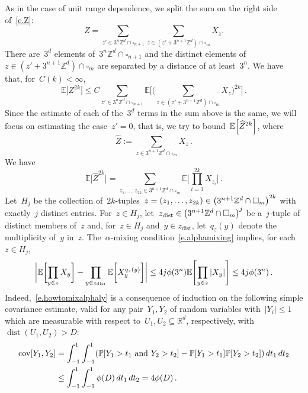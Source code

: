 \documentclass[11pt,twoside]{article} %
\let\oldsquare\square %
\renewcommand{\square}{\oldsquare}
\numberwithin{equation}{section}
\theoremstyle{definition}
\let\originalleft\left
\let\originalright\right
\renewcommand{\left}{\mathopen{}\mathclose\bgroup\originalleft}
\renewcommand{\right}{\aftergroup\egroup\originalright}
\newcommand*{\Zd}{\ensuremath{\mathbb{Z}^d}}
\newcommand*{\Rd}{\ensuremath{\mathbb{R}^d}}
\renewcommand*{\hat}{\widehat}
\newcommand{\cu}{\square}
\renewcommand{\P}{\mathbb{P}}
\newcommand{\E}{\mathbb{E}}
\DeclareMathOperator{\dist}{dist}
\DeclareMathOperator{\cov}{cov}
\begin{document}
As in the case of unit range dependence, we split the sum on the right side of~\eqref{e.Z}:
\begin{equation}
Z = \sum_{z'\in 3^n\Zd \cap \cu_{n+1}} \sum_{z\in (z'+3^{n+1}\Zd)\cap \cu_m} X_z.
\end{equation}
There are~$3^d$ elements of~$3^n\Zd \cap \cu_{n+1}$ and the distinct elements of~$z\in (z'+3^{n+1}\Zd)\cap \cu_m$ are separated by a distance of at least~$3^n$. We have that, for~$C(k)<\infty$, 
\begin{equation}
\E\bigl[ Z^{2k} \bigr] 
\leq 
C\sum_{z'\in 3^n\Zd \cap \cu_{n+1}}
\E \biggl[ 
\biggl( \sum_{z\in (z'+3^{n+1}\Zd)\cap \cu_m} X_z \biggr)^{\!\! 2k} 
\biggr]
\,.
\end{equation}
Since the estimate of each of the~$3^d$ terms in the sum above is the same, we will focus on estimating the case~$z'=0$, that is, we try to bound~$\E \left[ \hat{Z}^{2k} \right]$, where 
\begin{equation}
\hat{Z}:= \sum_{z\in  3^{n+1}\Zd \cap \cu_m} X_z
\,.  
\end{equation}
We have 
\begin{equation*} \label{}
\E \bigl[ \hat{Z}^{2k} \bigr]
=
\sum_{z_1,\ldots,z_{2k} \in 3^{n+1}\Zd\cap \cu_m} \E \biggl[ \prod_{i=1}^{2k} X_{z_i} \biggr]
\,.  
\end{equation*}
Let~$H_j$ be the collection of~$2k$-tuples~$z = (z_1,\ldots,z_{2k}) \in \left( 3^{n+1}\Zd\cap \cu_m \right)^{2k}$ with exactly~$j$ distinct entries. For~$z \in H_j$, let~$z_{\mathrm{dist}} \in \left( 3^{n+1}\Zd\cap \cu_m \right)^{j}$ be a~$j$-tuple of distinct members of~$z$ and, for~$z \in H_j$ and~$y \in z_{\mathrm{dist}}$, let~$q_z(y)$ denote the multiplicity of~$y$ in~$z$. The~$\alpha$-mixing condition~\eqref{e.alphamixing} implies, for each~$z \in H_j$,
\begin{equation} 
\label{e.howtomixalphaly}
\biggl| 
\E \biggl[ \prod_{y\in  z}  X_{y} \biggr]
-
\prod_{y \in z_{\mathrm{dist}}} \E \biggr[ X_{y}^{q_z(y)} \biggr]
\biggr|
\leq 
4 j  \phi(3^n) \E \left[  \prod_{y\in z} |  X_{y} | \right]
\leq 
4 j  \phi(3^n)
\,.
\end{equation}
Indeed,~\eqref{e.howtomixalphaly} is a consequence of induction on the following simple covariance estimate, valid for any pair~$Y_1,Y_2$ of random variables with~$|Y_i| \leq 1$ which are measurable with respect to~$U_1,U_2\subseteq\Rd$, respectively, with~$\dist(U_1,U_2)> D$:
\begin{align*}
\cov\left[Y_1,Y_2 \right]
&
=
\int_{-1}^1\int_{-1}^1
\left( \P \left[ Y_1>t_1 \ \mbox{and} \ Y_2>t_2 \right] 
-
\P \left[ Y_1>t_1\right]\P \left[ Y_2>t_2\right]
\right)\,dt_1\,dt_2
\\ & 
\leq 
\int_{-1}^1\int_{-1}^1 \phi(D) \,dt_1\,dt_2 = 4\phi(D)
\,.
\end{align*}
\end{document}
